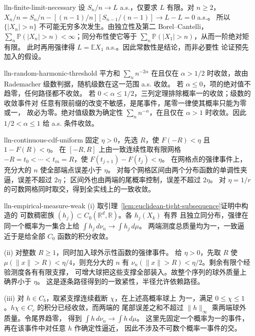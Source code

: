 \begin{solution}{lln-finite-limit-necessary}
设 $S_n/n\to L$ a.s.，仅要求 $L$ 有限。对 $n\ge2$，
$X_n/n=S_n/n-[(n-1)/n][S_{n-1}/(n-1)]\to L-L=0$ a.s.。
所以 $\{|X_n|>n\}$ 不可能无穷多次发生。由独立性及第二
Borel--Cantelli，$\sum_n\mathbb P(|X_n|>n)<\infty$；同分布性使它等于
$\sum_n\mathbb P(|X_1|>n)$，从而一阶绝对矩有限。
此时再用强律得 $L=\mathbb EX_1$ a.s.。因此常数性是结论，而非必要性
论证预先加入的假设。
\end{solution}

\begin{solution}{lln-random-harmonic-threshold}
平方和 $\sum_nn^{-2\alpha}$ 在且仅在 $\alpha>1/2$ 时收敛，故由
Rademacher 级数判据，随机级数在这一范围 a.s. 收敛。
若 $\alpha\le0$，项的绝对值不趋零，任何路径都不收敛。
若 $0<\alpha\le1/2$，三列定理排除概率一的收敛；级数的收敛事件对
任意有限前缀的改变不敏感，是尾事件，尾零一律使其概率只能为零或一，
故必为零。绝对值级数为确定性 $\sum_nn^{-\alpha}$，在且仅在
$\alpha>1$ 时收敛。因此 $1/2<\alpha\le1$ 给 a.s. 条件收敛。
\end{solution}

\begin{solution}{lln-continuous-cdf-uniform}
固定 $\eta>0$，先选 $R$，使 $F(-R)<\eta$ 且 $1-F(R)<\eta$。
在 $[-R,R]$ 上由一致连续性取有限网格
$-R=t_0<\cdots<t_m=R$，使 $F(t_{j+1})-F(t_j)<\eta$。
在网格点的强律事件上，充分大的 $n$ 使全部端点误差小于 $\eta$。
对每个网格区间由两个分布函数的单调性夹逼，误差不超过 $2\eta$；
区间外也由两端的尾概率控制，误差不超过 $2\eta$。
对 $\eta=1/r$ 的可数网格同时取交，得到全实线上的一致收敛。
\end{solution}

\begin{solution}{lln-empirical-measure-weak}
\textup{(i)} 取引理~\ref{lem:euclidean-tight-subsequence}证明中构造的
可数稠密族 $(h_j)\subset C_0(\mathbb R^d,\mathbb R)$。各 $h_j(X_k)$ 有界
且独立同分布，强律在同一个概率为一集合上给
$\int h_j\,d\nu_n\to\int h_j\,d\mu$。
两端测度总质量均为一，一致逼近于是给全部 $C_0$ 函数的积分收敛。

\textup{(ii)} 对整数 $R\ge1$，同时加入球外示性函数的强律事件。
给 $\eta>0$，先取 $R$ 使 $\mu(\|x\|>R)<\eta/4$，则充分大的 $n$ 有
$\nu_n(\|x\|>R)<\eta/2$。剩余有限个经验测度各有有限支撑，
可增大球把这些支撑全部装入。故整个序列的球外质量上确界小于 $\eta$。
这是逐条路径得到的一致紧性，半径允许依赖路径。

\textup{(iii)} 对 $h\in C_b$，取紧支撑连续截断 $\chi$，在上述高概率球上
为一，满足 $0\le\chi\le1$。$h\chi\in C_c$ 的积分已经收敛，而两端的
尾部误差之和不超过 $\|h\|_\infty$ 乘两端球外质量。令尾界趋零，
得到 $\int h\,d\nu_n\to\int h\,d\mu$。
这里先固定一个概率为一的事件，再在该事件中对任意 $h$ 作确定性逼近，
因此不涉及不可数个概率一事件的交。
\end{solution}
